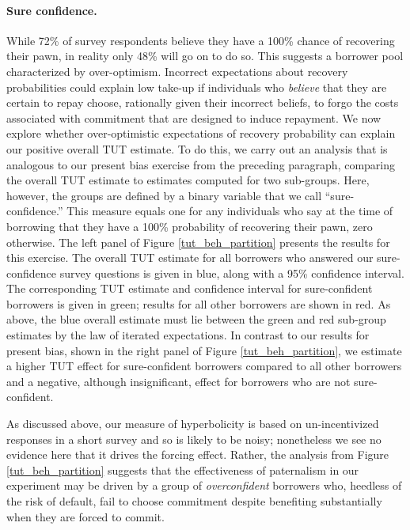 \documentclass[oneside,11pt]{article}
\begin{document}
\paragraph{Sure confidence.} While 72\% of survey respondents believe they have a 100\% chance of recovering their pawn, in reality only 48\% will go on to do so.  
This suggests a borrower pool characterized by over-optimism.
Incorrect expectations about recovery probabilities could explain low take-up if individuals who \emph{believe} that they are certain to repay choose, rationally given their incorrect beliefs, to forgo the costs associated with commitment that are designed to induce repayment. 
We now explore whether over-optimistic expectations of recovery probability can explain our positive overall TUT estimate.
To do this, we carry out an analysis that is analogous to our present bias exercise from the preceding paragraph, comparing the overall TUT estimate to estimates computed for two sub-groups.
Here, however, the groups are defined by a binary variable that we call ``sure-confidence.''
This measure equals one for any individuals who say at the time of borrowing that they have a 100\% probability of recovering their pawn, zero otherwise.
The left panel of Figure \ref{tut_beh_partition} presents the results for this exercise.
The overall TUT estimate for all borrowers who answered our sure-confidence survey questions is given in blue, along with a 95\% confidence interval.
The corresponding TUT estimate and confidence interval for sure-confident borrowers is given in green; results for all other borrowers are shown in red.
As above, the blue overall estimate must lie between the green and red sub-group estimates by the law of iterated expectations.
In contrast to our results for present bias, shown in the right panel of Figure \ref{tut_beh_partition}, we estimate a higher TUT effect for sure-confident borrowers compared to all other borrowers and a negative, although insignificant, effect for borrowers who are not sure-confident.

As discussed above, our measure of hyperbolicity is based on un-incentivized responses in a short survey and so is likely to be noisy; nonetheless we see no evidence here that it drives the forcing effect.  Rather, the analysis from Figure \ref{tut_beh_partition} suggests that the effectiveness of paternalism in our experiment may be driven by a group of \emph{overconfident} borrowers who, heedless of the risk of default, fail to choose commitment despite benefiting substantially when they are forced to commit. 
\end{document}

